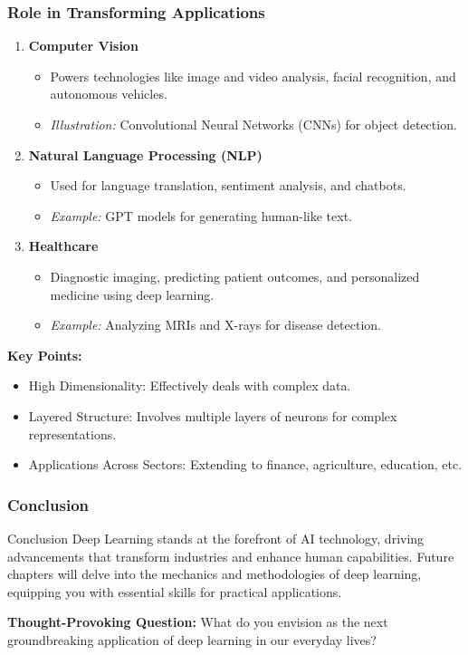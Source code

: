 \documentclass{beamer}
\begin{document}
\begin{frame}[fragile]
    \frametitle{Role in Transforming Applications}
    
    \begin{enumerate}
        \item \textbf{Computer Vision}
        \begin{itemize}
            \item Powers technologies like image and video analysis, facial recognition, and autonomous vehicles.
            \item \textit{Illustration:} Convolutional Neural Networks (CNNs) for object detection.
        \end{itemize}
        
        \item \textbf{Natural Language Processing (NLP)}
        \begin{itemize}
            \item Used for language translation, sentiment analysis, and chatbots.
            \item \textit{Example:} GPT models for generating human-like text.
        \end{itemize}
        
        \item \textbf{Healthcare}
        \begin{itemize}
            \item Diagnostic imaging, predicting patient outcomes, and personalized medicine using deep learning.
            \item \textit{Example:} Analyzing MRIs and X-rays for disease detection.
        \end{itemize}
    \end{enumerate}
    
    \textbf{Key Points:}
    \begin{itemize}
        \item High Dimensionality: Effectively deals with complex data.
        \item Layered Structure: Involves multiple layers of neurons for complex representations.
        \item Applications Across Sectors: Extending to finance, agriculture, education, etc.
    \end{itemize}
\end{frame}

\begin{frame}[fragile]
    \frametitle{Conclusion}
    
    \begin{block}{Conclusion}
        Deep Learning stands at the forefront of AI technology, driving advancements that transform industries and enhance human capabilities. Future chapters will delve into the mechanics and methodologies of deep learning, equipping you with essential skills for practical applications.
    \end{block}
    
    \textbf{Thought-Provoking Question:} 
    What do you envision as the next groundbreaking application of deep learning in our everyday lives?
\end{frame}
\end{document}
